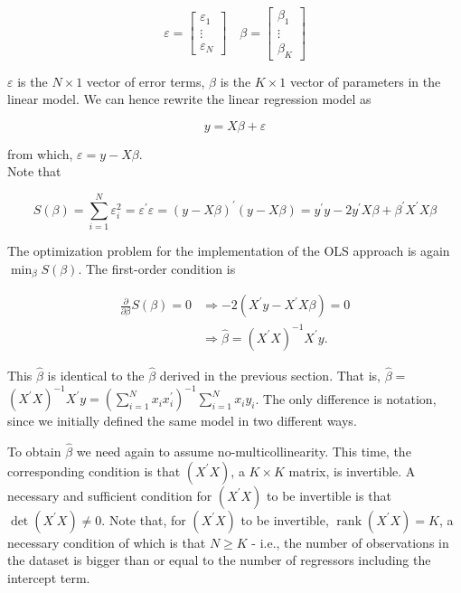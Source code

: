 $$
\varepsilon=\left[\begin{array}{c}
\varepsilon_{1} \\
\vdots \\
\varepsilon_{N}
\end{array}\right] \quad \beta=\left[\begin{array}{c}
\beta_{1} \\
\vdots \\
\beta_{K}
\end{array}\right]
$$

$\varepsilon$ is the $N \times 1$ vector of error terms, $\beta$ is the $K \times 1$ vector of parameters in the linear model. We can hence rewrite the linear regression model as

$$
y=X \beta+\varepsilon
$$

from which, $\varepsilon=y-X \beta$.\\
Note that

$$
S(\beta)=\sum_{i=1}^{N} \varepsilon_{i}^{2}=\varepsilon^{\prime} \varepsilon=(y-X \beta)^{\prime}(y-X \beta)=y^{\prime} y-2 y^{\prime} X \beta+\beta^{\prime} X^{\prime} X \beta
$$

The optimization problem for the implementation of the OLS approach is again $\min _{\beta} S(\beta)$. The first-order condition is

$$
\begin{aligned}
\frac{\partial}{\partial \beta} S(\beta)=0 & \Longrightarrow-2\left(X^{\prime} y-X^{\prime} X \beta\right)=0 \\
& \Longrightarrow \widehat{\beta}=\left(X^{\prime} X\right)^{-1} X^{\prime} y .
\end{aligned}
$$

This $\widehat{\beta}$ is identical to the $\widehat{\beta}$ derived in the previous section. That is, $\widehat{\beta}=$ $\left(X^{\prime} X\right)^{-1} X^{\prime} y=\left(\sum_{i=1}^{N} x_{i} x_{i}^{\prime}\right)^{-1} \sum_{i=1}^{N} x_{i} y_{i}$. The only difference is notation, since we initially defined the same model in two different ways.

To obtain $\widehat{\beta}$ we need again to assume no-multicollinearity. This time, the corresponding condition is that $\left(X^{\prime} X\right)$, a $K \times K$ matrix, is invertible. A necessary and sufficient condition for $\left(X^{\prime} X\right)$ to be invertible is that $\operatorname{det}\left(X^{\prime} X\right) \neq 0$. Note that, for $\left(X^{\prime} X\right)$ to be invertible, $\operatorname{rank}\left(X^{\prime} X\right)=K$, a necessary condition of which is that $N \geq K$ - i.e., the number of observations in the dataset is bigger than or equal to the number of regressors including the intercept term.

